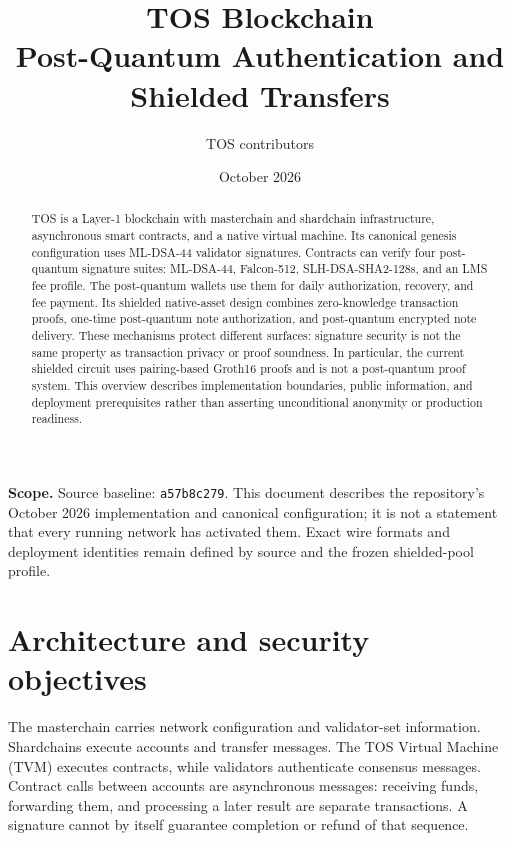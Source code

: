\documentclass[11pt,a4paper]{article}
\title{TOS Blockchain\\\large Post-Quantum Authentication and Shielded Transfers}
\author{TOS contributors}
\date{October 2026}
\newcommand{\code}[1]{\texttt{#1}}
\begin{document}
\maketitle
\begin{abstract}
TOS is a Layer-1 blockchain with masterchain and shardchain infrastructure,
asynchronous smart contracts, and a native virtual machine. Its canonical
genesis configuration uses ML-DSA-44 validator signatures. Contracts can
verify four post-quantum signature suites: ML-DSA-44, Falcon-512,
SLH-DSA-SHA2-128s, and an LMS fee profile. The post-quantum wallets use them
for daily authorization, recovery, and fee payment. Its shielded
native-asset design combines zero-knowledge transaction proofs, one-time
post-quantum note authorization, and post-quantum encrypted note delivery.
These mechanisms protect different surfaces: signature security is not the
same property as transaction privacy or proof soundness. In particular, the
current shielded circuit uses pairing-based Groth16 proofs and is not a
post-quantum proof system. This overview describes implementation boundaries,
public information, and deployment prerequisites rather than asserting
unconditional anonymity or production readiness.
\end{abstract}
\textbf{Scope.} Source baseline: \code{a57b8c279}. This document describes the
repository's October 2026 implementation and canonical configuration; it is
not a statement that every running network has activated them. Exact wire
formats and deployment identities remain defined by source and the frozen
shielded-pool profile.
\setcounter{tocdepth}{1}
\tableofcontents
\newpage

\section{Architecture and security objectives}
The masterchain carries network configuration and validator-set information.
Shardchains execute accounts and transfer messages. The TOS Virtual Machine
(TVM) executes contracts, while validators authenticate consensus messages.
Contract calls between accounts are asynchronous messages: receiving funds,
forwarding them, and processing a later result are separate transactions.
A signature cannot by itself guarantee completion or refund of that sequence.
\end{document}
